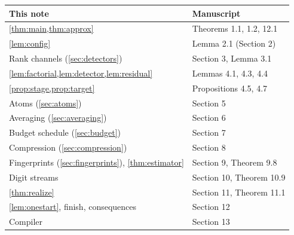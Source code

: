 \documentclass[11pt]{article}
\theoremstyle{definition}
\theoremstyle{remark}
\begin{document}
\begin{center}\small
\renewcommand{\arraystretch}{1.15}
\begin{tabular}{@{}ll@{}}
\toprule
\textbf{This note} & \textbf{Manuscript} \\
\midrule
\cref{thm:main,thm:approx} & Theorems 1.1, 1.2, 12.1 \\
\cref{lem:config} & Lemma 2.1 (Section 2) \\
Rank channels (\cref{sec:detectors}) & Section 3, Lemma 3.1 \\
\cref{lem:factorial,lem:detector,lem:residual} & Lemmas 4.1, 4.3, 4.4 \\
\cref{prop:stage,prop:target} & Propositions 4.5, 4.7 \\
Atoms (\cref{sec:atoms}) & Section 5 \\
Averaging (\cref{sec:averaging}) & Section 6 \\
Budget schedule (\cref{sec:budget}) & Section 7 \\
Compression (\cref{sec:compression}) & Section 8 \\
Fingerprints (\cref{sec:fingerprints}), \cref{thm:estimator} & Section 9, Theorem 9.8 \\
Digit streams & Section 10, Theorem 10.9 \\
\cref{thm:realize} & Section 11, Theorem 11.1 \\
\cref{lem:onestart}, finish, consequences & Section 12 \\
Compiler & Section 13 \\
\bottomrule
\end{tabular}
\end{center}
\end{document}
